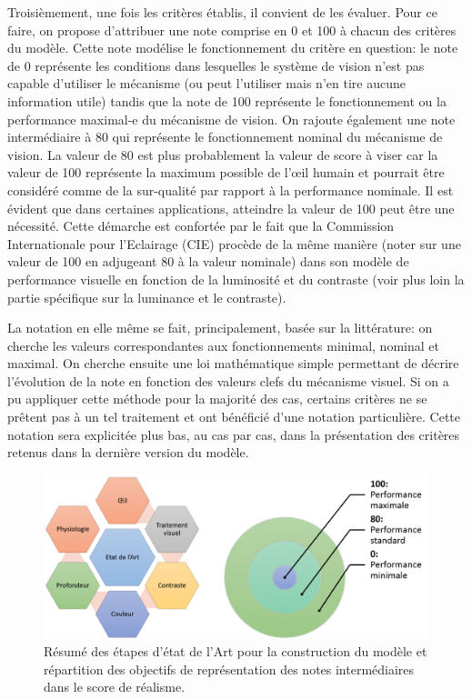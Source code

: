 	\par Troisièmement, une fois les critères établis, il convient de les évaluer. Pour ce faire, on propose d'attribuer une note comprise en 0 et 100 à chacun des critères du modèle. Cette note modélise le fonctionnement du critère en question: le note de 0 représente les conditions dans lesquelles le système de vision n'est pas capable d'utiliser le mécanisme (ou peut l'utiliser mais n'en tire aucune information utile) tandis que la note de 100 représente le fonctionnement ou la performance maximal-e du mécanisme de vision. On rajoute également une note intermédiaire à 80 qui représente le fonctionnement nominal du mécanisme de vision. La valeur de 80 est plus probablement la valeur de score à viser car la valeur de 100 représente la maximum possible de l'œil humain et pourrait être considéré comme de la sur-qualité par rapport à la performance nominale. Il est évident que dans certaines applications, atteindre la valeur de 100 peut être une nécessité. Cette démarche est confortée par le fait que la Commission Internationale pour l'Eclairage (CIE) procède de la même manière (noter sur une valeur de 100 en adjugeant 80 à la valeur nominale) dans son modèle de performance visuelle en fonction de la luminosité et du contraste (voir plus loin la partie spécifique sur la luminance et le contraste). 
	
	\par La notation en elle même se fait, principalement, basée sur la littérature: on cherche les valeurs correspondantes aux fonctionnements minimal, nominal et maximal. On cherche ensuite une loi mathématique simple permettant de décrire l'évolution de la note en fonction des valeurs clefs du mécanisme visuel. Si on a pu appliquer cette méthode pour la majorité des cas, certains critères ne se prêtent pas à un tel traitement et ont bénéficié d'une notation particulière. Cette notation sera explicitée plus bas, au cas par cas, dans la présentation des critères retenus dans la dernière version du modèle.
	
	\begin{figure}
		\centering
		\includegraphics[scale=.50]{Figures/EDLAProcessScoreTarget}
		\caption{Résumé des étapes d'état de l'Art pour la construction du modèle et répartition des objectifs de représentation des notes intermédiaires dans le score de réalisme.}
		\label{fig:edla_process_score_target}
	\end{figure}
	
